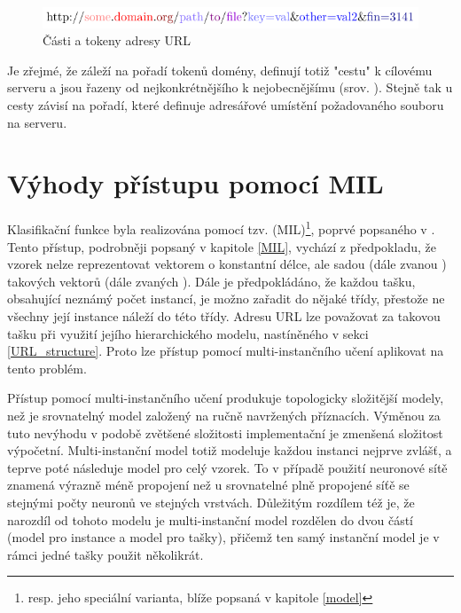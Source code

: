 \begin{figure}[h]
	\centering
	\includegraphics{images/url_subparts/url_subparts.pdf}
	\caption{Části a tokeny adresy URL}\label{url_subparts}
\end{figure}

Je zřejmé, že záleží na pořadí tokenů domény, definují totiž "cestu" k cílovému serveru a jsou řazeny od nejkonkrétnějšího k nejobecnějšímu (srov. \cite{mockapetris_domain_1987}). Stejně tak u cesty závisí na pořadí, které definuje adresářové umístění požadovaného souboru na serveru.

\section{Výhody přístupu pomocí MIL}

Klasifikační funkce byla realizována pomocí tzv.  (MIL)\footnote{resp. jeho speciální varianta, blíže popsaná v kapitole \ref{model}}, poprvé popsaného v \cite{dietterich_solving_1997}. Tento přístup, podrobněji popsaný v kapitole \ref{MIL}, vychází z předpokladu, že vzorek nelze reprezentovat vektorem o konstantní délce, ale sadou (dále zvanou ) takových vektorů (dále zvaných ). Dále je předpokládáno, že každou tašku, obsahující neznámý počet instancí, je možno zařadit do nějaké třídy, přestože ne všechny její instance náleží do této třídy. Adresu URL lze považovat za takovou tašku při využití jejího hierarchického modelu, nastíněného v sekci \ref{URL_structure}. Proto lze přístup pomocí multi-instančního učení aplikovat na tento problém.

Přístup pomocí multi-instančního učení produkuje topologicky složitější modely, než je srovnatelný model založený na ručně navržených příznacích. Výměnou za tuto nevýhodu v podobě zvětšené složitosti implementační je zmenšená složitost výpočetní. Multi-instanční model totiž modeluje každou instanci nejprve zvlášť, a teprve poté následuje model pro celý vzorek. To v případě použití neuronové sítě znamená výrazně méně propojení než u srovnatelné plně propojené síťě se stejnými počty neuronů ve stejných vrstvách. Důležitým rozdílem též je, že narozdíl od tohoto modelu je multi-instanční model rozdělen do dvou částí (model pro instance a model pro tašky), přičemž ten samý instanční model je v rámci jedné tašky použit několikrát.

